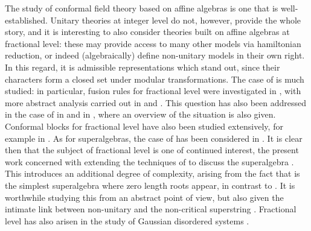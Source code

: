 \documentclass[a4paper,12pt]{article}
\def\hslc        {\hat{sl}(2|1;{\mathbb C})}
\begin{document}
The study of conformal field theory based on affine algebras is one
that is well-established.  Unitary theories at integer level do not,
however, provide the whole story, and it is interesting to also
consider theories built on affine algebras at fractional level: these
may provide access to many other models via hamiltonian reduction, or
indeed (algebraically) define non-unitary models in 
their own right.  In this regard, it is admissible representations
which stand out, since their characters form a closed set under
modular transformations.  The case of \coordHE{} is much studied:
in particular, fusion rules for fractional level were investigated in
\cite{MW, AY, BF, FGP}, with more abstract analysis carried out in
\cite{FM} and \cite{DLM}. This question has also been
addressed in the case of \coordHE{} in \cite{FGP1, FGP2} and 
in \cite{GPW}, where an overview of the \coordHE{} situation is also given.  
Conformal blocks for fractional level \coordHE{} have also been studied
extensively, for example in \cite{FGP, PRY, And}.  As for
superalgebras, the case of \coordHE{} has been considered in
\cite{ER}.  It is clear then that the subject of fractional level is
one of continued interest, the present work concerned with extending
the techniques of \cite{ER} to discuss the superalgebra \myHighlight{$\hslc$}\coordHE{}.  This
introduces an additional degree of complexity, arising from the
fact that \myHighlight{$\hslc$}\coordHE{} is the simplest superalgebra where zero length
roots appear, in contrast to \coordHE{}.  It is worthwhile
studying this from an abstract point of view, but also given the
intimate link between non-unitary \myHighlight{$\hslc$}\coordHE{} and the \coordHE{} non-critical
superstring \cite{Sem}.  Fractional level \myHighlight{$\hslc$}\coordHE{} has also arisen in
the study of Gaussian disordered systems \cite{MS}. 
\end{document}
